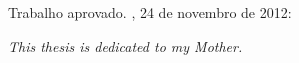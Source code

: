 \documentclass[
	12pt,				%
	openright,		nsubseteq	%
	twoside,			%
	a4paper,			%
	english,			%
	french,				%
	spanish,			%
	brazil				%
	]{abntex2}
\begin{document}
%
% 
%
\begin{folhadeaprovacao}

  \begin{center}
    {\ABNTEXchapterfont\large\imprimirautor}

    \vspace*{\fill}\vspace*{\fill}
    \begin{center}
      \ABNTEXchapterfont\bfseries\Large\imprimirtitulo
    \end{center}
    \vspace*{\fill}
    
    \hspace{.45\textwidth}
    \begin{minipage}{.5\textwidth}
        \imprimirpreambulo
    \end{minipage}%
    \vspace*{\fill}
   \end{center}
        
   Trabalho aprovado. \imprimirlocal, 24 de novembro de 2012:

      
   \begin{center}
    \vspace*{0.5cm}
    {\large\imprimirlocal}
    \par
    {\large\imprimirdata}
    \vspace*{1cm}
  \end{center}
  
\end{folhadeaprovacao}

\begin{dedicatoria}
   \vspace*{\fill}
   \centering
   \noindent
   \textit{ This thesis is dedicated to my Mother.} \vspace*{\fill}
\end{dedicatoria}
\end{document}
